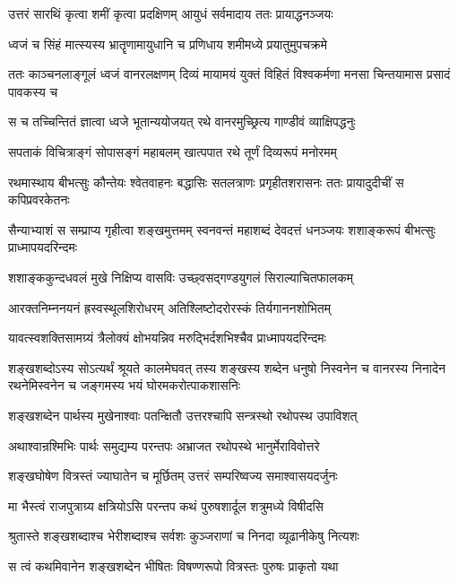 \twolineshloka
{उत्तरं सारथिं कृत्वा शमीं कृत्वा प्रदक्षिणम्}
{आयुधं सर्वमादाय ततः प्रायाद्धनञ्जयः}


\twolineshloka
{ध्वजं च सिंहं मात्स्यस्य भ्रातॄणामायुधानि च}
{प्रणिधाय शमीमध्ये प्रयातुमुपचक्रमे}


\threelineshloka
{ततः काञ्चनलाङ्गूलं ध्वजं वानरलक्षणम्}
{दिव्यं मायामयं युक्तं विहितं विश्वकर्मणा}
{मनसा चिन्तयामास प्रसादं पावकस्य च}


\twolineshloka
{स च तच्चिन्तितं ज्ञात्वा ध्वजे भूतान्ययोजयत्}
{रथे वानरमुच्छ्रित्य गाण्डीवं व्याक्षिपद्धनुः}


\twolineshloka
{सपताकं विचित्राङ्गं सोपासङ्गं महाबलम्}
{खात्पपात रथे तूर्णं दिव्यरूपं मनोरमम्}


\threelineshloka
{रथमास्थाय बीभत्सुः कौन्तेयः श्वेतवाहनः}
{बद्धासिः सतलत्राणः प्रगृहीतशरासनः}
{ततः प्रायादुदीचीं स कपिप्रवरकेतनः}


\threelineshloka
{सैन्याभ्याशं स सम्प्राप्य गृहीत्वा शङ्खमुत्तमम्}
{स्वनवन्तं महाशब्दं देवदत्तं धनञ्जयः}
{शशाङ्करूपं बीभत्सुः प्राध्मापयदरिन्दमः}


\twolineshloka
{शशाङ्ककुन्दधवलं मुखे निक्षिप्य वासविः}
{उच्छ्वसद्गण्डयुगलं सिराल्याचितफालकम्}


\twolineshloka
{आरक्तनिम्ननयनं ह्रस्वस्थूलशिरोधरम्}
{अतिश्लिष्टोदरोरस्कं तिर्यगाननशोभितम्}


\twolineshloka
{यावत्स्वशक्तिसामग्र्यं त्रैलोक्यं क्षोभयन्निव}
{मरुद्भिर्दशभिश्चैव प्राध्मापयदरिन्दमः}


\onelineshloka
{शङ्खशब्दोऽस्य सोऽत्यर्थं श्रूयते कालमेघवत्}
\threelineshloka
{तस्य शङ्खस्य शब्देन धनुषो निस्वनेन च}
{वानरस्य निनादेन रथनेमिस्वनेन च}
{जङ्गमस्य भयं घोरमकरोत्पाकशासनिः}


\twolineshloka
{शङ्खशब्देन पार्थस्य मुखेनाश्वाः पतन्क्षितौ}
{उत्तरश्चापि सन्त्रस्थो रथोपस्थ उपाविशत्}


\twolineshloka
{अथाश्वान्रश्मिभिः पार्थः समुद्यम्य परन्तपः}
{अभ्राजत रथोपस्थे भानुर्मेराविवोत्तरे}


\twolineshloka
{शङ्खघोषेण वित्रस्तं ज्याघातेन च मूर्छितम्}
{उत्तरं सम्परिष्वज्य समाश्वासयदर्जुनः}


\twolineshloka
{मा भैस्त्वं राजपुत्राग्र्य क्षत्रियोऽसि परन्तप}
{कथं पुरुषशार्दूल शत्रुमध्ये विषीदसि}


\twolineshloka
{श्रुतास्ते शङ्खशब्दाश्च भेरीशब्दाश्च सर्वशः}
{कुञ्जराणां च निनदा व्यूढानीकेषु नित्यशः}


\twolineshloka
{स त्वं कथमिवानेन शङ्खशब्देन भीषितः}
{विषण्णरूपो वित्रस्तः पुरुषः प्राकृतो यथा}

